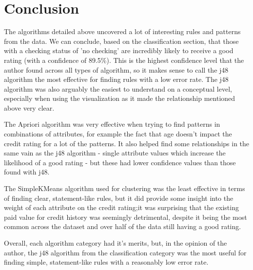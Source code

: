 \documentclass[runningheads, 12pt]{llncs}
\begin{document}
\section{Conclusion}
The algorithms detailed above uncovered a lot of interesting rules and patterns from the data. We can conclude, based on the classification section, that those with a checking status of 'no checking' are incredibly likely to receive a good rating (with a confidence of 89.5\%). This is the highest confidence level that the author found across all types of algorithm, so it makes sense to call the j48 algorithm the most effective for finding rules with a low error rate. The j48 algorithm was also arguably the easiest to understand on a conceptual level, especially when using the visualization as it made the relationship mentioned above very clear.

The Apriori algorithm was very effective when trying to find patterns in combinations of attributes, for example the fact that age doesn't impact the credit rating for a lot of the patterns. It also helped find some relationships in the same vain as the j48 algorithm - single attribute values which increase the likelihood of a good rating - but these had lower confidence values than those found with j48.

The SimpleKMeans algorithm used for clustering was the least effective in terms of finding clear, statement-like rules, but it did provide some insight into the weight of each attribute on the credit rating;it was surprising that the existing paid value for credit history was seemingly detrimental, despite it being the most common across the dataset and over half of the data still having a good rating.

Overall, each algorithm category had it's merits, but, in the opinion of the author, the j48 algorithm from the classification category was the most useful for finding simple, statement-like rules with a reasonably low error rate.

%
%
%



\end{document}

